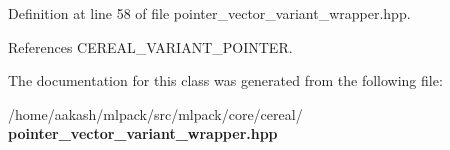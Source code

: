 Definition at line 58 of file pointer\+\_\+vector\+\_\+variant\+\_\+wrapper.\+hpp.



References C\+E\+R\+E\+A\+L\+\_\+\+V\+A\+R\+I\+A\+N\+T\+\_\+\+P\+O\+I\+N\+T\+ER.



The documentation for this class was generated from the following file\+:\begin{DoxyCompactItemize}
\item 
/home/aakash/mlpack/src/mlpack/core/cereal/\textbf{ pointer\+\_\+vector\+\_\+variant\+\_\+wrapper.\+hpp}\end{DoxyCompactItemize}
